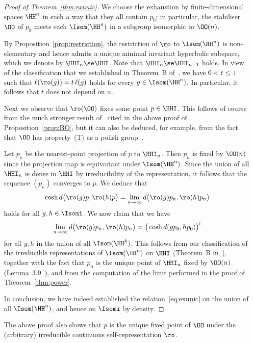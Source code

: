 \begin{proof}[Proof of Theorem~\ref{thm:exunic}]
We choose the exhaustion by finite-dimensional spaces $\HH^n$ in such a way that they all contain $p_0$; in particular, the stabiliser $\OO$ of $p_0$ meets each $\Isom(\HH^n)$ in a subgroup isomorphic to $\OO(n)$.

By Proposition~\ref{prop:restriction}, the restriction of $\ro$ to $\Isom(\HH^n)$ is non-elementary and hence admits a unique minimal invariant hyperbolic subspace, which we denote by $\HHI_n\se \HHI$. Note that $\HHI_n\se \HHI_{n+1}$ holds. In view of the classification that we established in Theorem~B of~\cite{Monod-Py}, we have $0<t\leq 1$ such that $\ell(\ro(g)) = t \, \ell(g)$ holds for every $g\in \Isom(\HH^n)$. In particular, it follows that $t$ does not depend on $n$.

Next we observe that $\ro(\OO)$ fixes some point $p\in\HHI$. This follows of course from the much stronger result of~\cite{Ricard-Rosendal} cited in the above proof of Proposition~\ref{prop:BO}, but it can also be deduced, for example, from the fact that $\OO$ has property~(T) as a polish group~\cite[Rem.~3$\MK$(i)]{Bekka03}.

Let $p_n$ be the nearest-point projection of $p$ to $\HHI_n$. Then $p_n$ is fixed by $\OO(n)$ since the projection map is equivariant under $\Isom(\HH^n)$. Since the union of all $\HHI_n$ is dense in $\HHI$ by irreducibility of the representation, it follows that the sequence $(p_n)$ converges to $p$. We deduce that
\[
\cosh d\big(\ro(g) p, \ro(h) p\big) = \lim_{n\to\infty} d\big(\ro(g) p_n, \ro(h) p_n\big)
\]
holds for all $g,h\in\Isomi$. We now claim that we have
\[
\lim_{n\to\infty} d\big(\ro(g) p_n, \ro(h) p_n\big) = \big(\cosh d(g p_0, h p_0)\big)^t
\]
for all $g,h$ in the union of all $\Isom(\HH^k)$. This follows from our classification of the irreducible representations of $\Isom(\HH^n)$ on $\HHI$ (Theorem~B in~\cite{Monod-Py}), together with the fact that $p_n$ is the unique point of $\HHI_n$ fixed by $\OO(n)$ (Lemma~3.9~\cite{Monod-Py}), and from the computation of the limit performed in the proof of Theorem~\ref{thm:power}.

In conclusion, we have indeed established the relation~\eqref{eq:exunic} on the union of all $\Isom(\HH^n)$, and hence on $\Isomi$ by density.
\end{proof}

\begin{rema}\label{rem:unique:O}
The above proof also shows that $p$ is the unique fixed point of $\OO$ under the (arbitrary) irreducible continuous self-representation $\ro$.
\end{rema}

